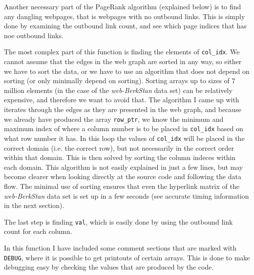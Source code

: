 \documentclass[10pt, a4paper]{amsart}
\numberwithin{figure}{section}
\numberwithin{table}{section}
\begin{document}
Another necessary part of the PageRank algorithm (explained below) is to find any dangling webpages, that is webpages with no outbound links. This is simply done by examining the outbound link count, and see which page indices that has noe outbound links.

The most complex part of this function is finding the elements of \texttt{col\_idx}. We cannot assume that the edges in the web graph are sorted in any way, so either we have to sort the data, or we have to use an algorithm that does not depend on sorting (or only minimally depend on sorting). Sorting arrays up to sizes of 7 million elements (in the case of the \textit{web-BerkStan} data set) can be relatively expensive, and therefore we want to avoid that. The algorithm I came up with iterates through the edges as they are presented in the web graph, and because we already have produced the array \texttt{row\_ptr}, we know the minimum and maximum index of where a column number is to be placed in \texttt{col\_idx} based on what row number it has. In this loop the values of \texttt{col\_idx} will be placed in the correct domain (i.e. the correct row), but not necessarily in the correct order within that domain. This is then solved by sorting the column indeces within each domain. This algorithm is not easily explained in just a few lines, but may become clearer when looking directly at the source code and following the data flow. The minimal use of sorting ensures that even the hyperlink matrix of the \textit{web-BerkStan} data set is set up in a few seconds (see accurate timing information in the next section).

The last step is finding \texttt{val}, which is easily done by using the outbound link count for each column.

In this function I have included some comment sections that are marked with \texttt{DEBUG}, where it is possible to get printouts of certain arrays. This is done to make debugging easy by checking the values that are produced by the code.
\end{document}
